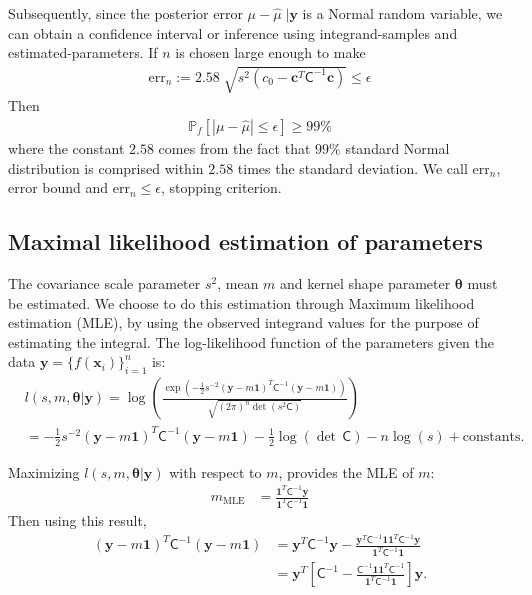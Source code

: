 \documentclass[smallextended]{svjour3}       %
\newcommand{\bm}[1]{\boldsymbol{#1}}
\newcommand{\vtheta}{{\bm{\theta}}}
\newcommand{\vc}{\bm{c}}
\newcommand{\vx}{\bm{x}}
\newcommand{\vy}{\bm{y}}
\newcommand{\vone}{\bm{1}}
\newcommand{\mC}{\mathsf{C}}
\newcommand{\mCInv}{{\mathsf{C}^{-1}}}
\newcommand{\hmu}{\hat{\mu}}
\newcommand{\MLE}{\text{MLE}}
\newcommand{\errtol}{\epsilon}
\newcommand{\errn}{\text{err}_{n}}
\newenvironment{nalign}{
    \begin{equation}
    \begin{aligned}
}{
    \end{aligned}
    \end{equation}
    \ignorespacesafterend
}
\begin{document}
Subsequently, since the posterior error $\mu-\hmu\;|\vy$ is a Normal random variable, we can obtain a confidence interval or inference using integrand-samples and estimated-parameters. If $n$ is chosen large enough to make
\begin{align}
\errn := 2.58 \; \sqrt{ s^2 (c_0 - \vc^T\mC^{-1}\vc) } \leq \errtol
\end{align}
Then
\begin{align}
\label{eqn_prob_confidence_interval}
\mathbb{P}_f \left[
|\mu-\hmu| \leq \errtol
\right] \geq 99\%
\end{align}
where the constant $2.58$ comes from the fact that $99\%$ standard Normal distribution is comprised within $2.58$ times the standard deviation. We call $\errn$, error bound and $\errn \leq \errtol$, stopping criterion.















\subsection{Maximal likelihood estimation of parameters}
The covariance scale parameter $s^2$, mean $m$ and kernel shape parameter $\vtheta$ must be estimated. We choose to do this estimation through Maximum likelihood estimation (MLE), by using the observed integrand values for the purpose of estimating the integral.  The log-likelihood function of the parameters given the data $\vy = \{f(\vx_i)\}_{i=1}^n$ is:
\begin{nalign}
& l(s,m,\vtheta | \vy) = \log 
\left(
\frac{
\exp\left( -\frac{1}{2} s^{-2} (\vy-m\vone)^T\mCInv(\vy-m\vone)\right) }
{\sqrt{(2\pi)^n \det(s^2\mC)}}
\right) 
\\
&= -\frac{1}{2} s^{-2} (\vy-m\vone)^T\mCInv(\vy-m\vone) - \frac{1}{2} \log(\det\, \mC) - n \log(s ) + \text{constants.}
\end{nalign}

Maximizing $l(s,m,\vtheta | \vy)$ with respect to $m$, provides the MLE of $m$:
\begin{align}
\label{eqn_m_MLE}
m_\MLE &= \frac{\vone^T \mCInv \vy }{ \vone^T \mCInv \vone}
\end{align}
Then using this result, 
\begin{align*}
(\vy-m\vone)^T\mCInv(\vy-m\vone) 
& = 
\vy^T\mCInv\vy - \frac{\vy^T \mCInv \vone \vone^T \mCInv \vy}{\vone^T\mCInv \vone}
\\
& = \vy^T 
\left[ 
\mCInv - 
\frac{ \mCInv \vone \vone^T \mCInv }{\vone^T\mCInv \vone}
\right] \vy.
\end{align*}
\end{document}
